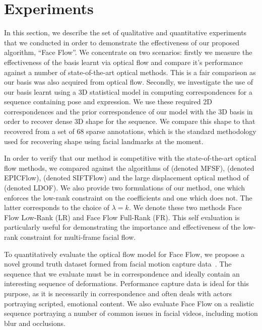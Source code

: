 \section{Experiments}\label{sec:face_flow_experiments}
In this section, we describe the set of qualitative and quantitative experiments
that we conducted in order to demonstrate the effectiveness of our proposed algorithm,
``Face Flow''. We concentrate on two scenarios: firstly we measure the effectiveness
of the basis learnt via optical flow and compare it's performance against
a number of state-of-the-art optical methods. This is a fair comparison as our
basis was also acquired from optical flow. Secondly, we investigate the use
of our basis learnt using a 3D statistical model in computing correspondences
for a sequence containing pose and expression. We use these required 2D correspondences
and the prior correspondence of our model with the 3D basis in order to recover
dense 3D shape for the sequence. We compare this shape to that recovered from
a set of 68 sparse annotations, which is the standard methodology used for recovering
shape using facial landmarks at the moment.

In order to verify that our method is competitive with the state-of-the-art
optical flow methods,
we compared against the algorithms of
\citet{garg2013variational} (denoted MFSF),
\citet{revaud2015epicflow} (denoted EPICFlow),
\citet{liu2011sift} (denoted SIFTFlow) and the large displacement
optical method of \citet{brox2011large} (denoted LDOF). We also provide two
formulations of our method, one which enforces the low-rank constraint on the coefficients
and one which does not. The latter corresponds to the choice of $\lambda=k$.
We denote these two methods Face Flow Low-Rank (LR) and Face Flow
Full-Rank (FR). This self evaluation is particularly useful for demonstrating the importance
and effectiveness of the low-rank constraint for multi-frame facial flow.

To quantitatively evaluate the optical flow model for Face Flow, 
we propose a novel ground truth dataset formed
from facial motion capture data~\cite{zhang2004spacetime}. The sequence that we
evaluate must be in correspondence and ideally contain an interesting
sequence of deformations. Performance capture data is ideal for this purpose, as
it is necessarily in correspondence and often deals with actors portraying
scripted, emotional content. We also evaluate Face Flow on a realistic sequence
portraying a number of common issues in facial videos, including motion blur
and occlusions.

